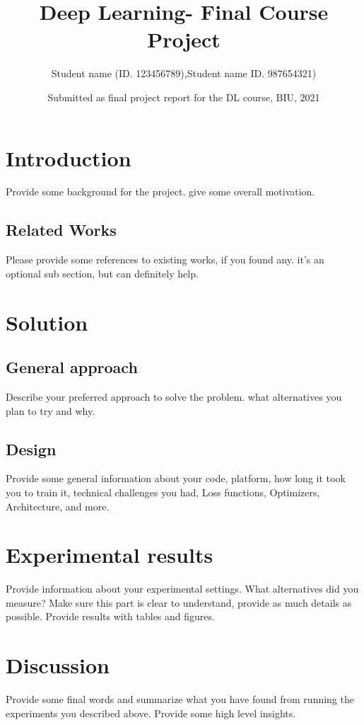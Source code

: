 \documentclass{article}
\title{Deep Learning- Final Course Project}
\author{Student name (ID. 123456789),Student name ID. 987654321)}
\date{Submitted as final project report for the DL course, BIU, 2021}
\begin{document}
\maketitle

\section{Introduction}

Provide some background for the project. give some overall motivation.

\subsection{Related Works}
Please provide some references to existing works, if you found any. it's an optional sub section, but can definitely help.



\section{Solution}
\subsection{General approach}
Describe your preferred approach to solve the problem. what alternatives you plan to try and why.

\subsection{Design}
Provide some general information about your code, platform, how long it took you to train it, technical challenges you had, Loss functions, Optimizers, Architecture, and more.

\section{Experimental results}
Provide information about your experimental settings. What alternatives did you measure? Make sure this part is clear to understand, provide as much details as possible. Provide results with tables and figures.

\section{Discussion}
Provide some final words and summarize what you have found from running the experiments you described above. Provide some high level insights.
\end{document}
